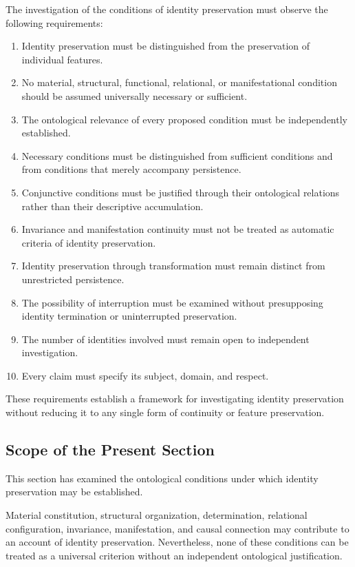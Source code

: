 The investigation of the conditions of identity
preservation must observe the following requirements:

\begin{enumerate}
    \item Identity preservation must be distinguished
    from the preservation of individual features.
    \item No material, structural, functional,
    relational, or manifestational condition
    should be assumed universally necessary
    or sufficient.
    \item The ontological relevance of every
    proposed condition must be independently
    established.
    \item Necessary conditions must be distinguished
    from sufficient conditions and from conditions
    that merely accompany persistence.
    \item Conjunctive conditions must be justified
    through their ontological relations rather
    than their descriptive accumulation.
    \item Invariance and manifestation continuity
    must not be treated as automatic criteria
    of identity preservation.
    \item Identity preservation through transformation
    must remain distinct from unrestricted persistence.
    \item The possibility of interruption must be
    examined without presupposing identity termination
    or uninterrupted preservation.
    \item The number of identities involved must
    remain open to independent investigation.
    \item Every claim must specify its subject,
    domain, and respect.
\end{enumerate}

These requirements establish a framework for
investigating identity preservation without
reducing it to any single form of continuity
or feature preservation.

\subsection{Scope of the Present Section}

This section has examined the ontological conditions
under which identity preservation may be established.

Material constitution, structural organization,
determination, relational configuration, invariance,
manifestation, and causal connection may contribute
to an account of identity preservation. Nevertheless,
none of these conditions can be treated as a
universal criterion without an independent
ontological justification.

